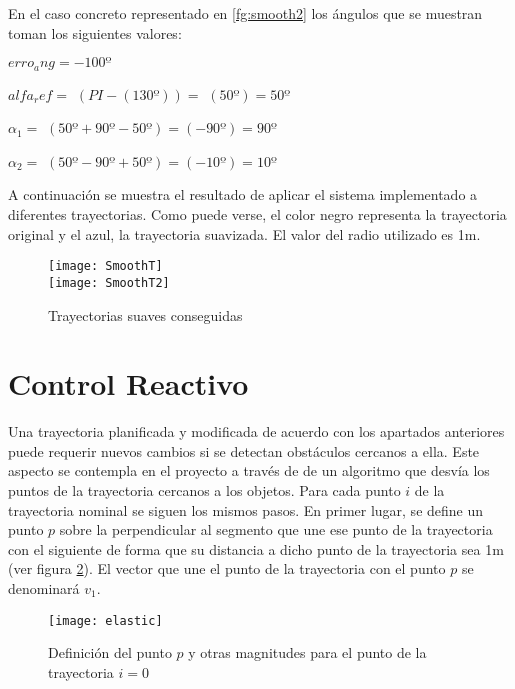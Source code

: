En el caso concreto representado en \ref{fg:smooth2} los ángulos que se muestran toman los siguientes valores:
\vspace{0.5cm}

${erro_ang} = -100º$

$alfa_ref =$ $(PI - (130º)) =$ $(50º) = 50º$

$\alpha_{1} =$ $(50º + 90º - 50º) = $$(-90º) = 90º$

$\alpha_{2} =$ $(50º - 90º +50º) = $$(-10º) = 10º$

\vspace{0.5cm}
A continuación se muestra el resultado de aplicar el sistema implementado a diferentes trayectorias. Como puede verse, el color negro representa la trayectoria original y el azul, la trayectoria suavizada. El valor del radio utilizado es 1m.

\begin{figure}[h]
  \centering\texttt{[image: SmoothT]}\\
  \vspace{0.2cm}\texttt{[image: SmoothT2]}\label{fg:smoothT}
  \caption{Trayectorias suaves conseguidas}
\end{figure}

\section{Control Reactivo}\label{reactivo}

Una trayectoria planificada y modificada de acuerdo con los apartados anteriores puede requerir nuevos cambios si se detectan obstáculos cercanos a ella. Este aspecto se contempla en el proyecto a través de de un algoritmo que desvía los puntos de la trayectoria cercanos a los objetos. Para cada punto $i$ de la trayectoria nominal se siguen los mismos pasos. En primer lugar, se define un punto $p$ sobre la perpendicular al segmento que une ese punto de la trayectoria con el siguiente de forma que su distancia a dicho punto de la trayectoria sea 1m (ver figura \ref{fg:elastic}). El vector que une el punto de la trayectoria con el punto $p$ se denominará $v_{1}$.

\begin{figure}[h]
  \centering\texttt{[image: elastic]}\\
  \caption{Definición del punto $p$ y otras magnitudes para el punto de la trayectoria $i = 0$}\label{fg:elastic}
\end{figure}

